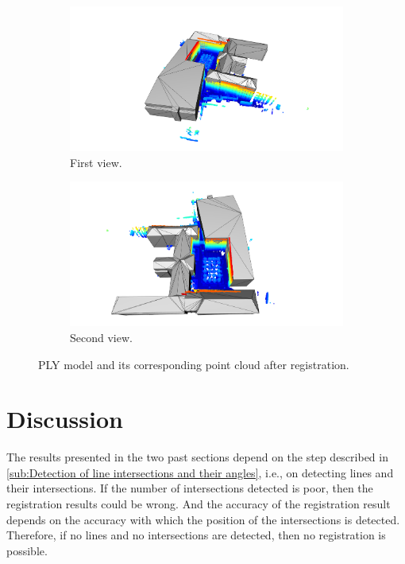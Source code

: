         \begin{figure}[H]
            \centering
            \begin{subfigure}{1\textwidth}
                \centering
                \includegraphics[scale=0.2]{images/solution_images/final_ply_a.png}
                \caption{First view.}
                \label{fig:final_ply_a}
            \end{subfigure}
            \hfill
            \begin{subfigure}{1\textwidth}
                \centering
                \includegraphics[scale=0.2]{images/solution_images/final_ply_b.png}
                \caption{Second view.}
                \label{fig:final_ply_b}
            \end{subfigure}
            \caption{PLY model and its corresponding point cloud after registration.}
            \label{fig:final_ply}
        \end{figure}

    \section{Discussion}
        The results presented in the two past sections depend on the step described in 
        \autoref{sub:Detection of line intersections and their angles}, i.e., on detecting lines and their intersections.
        If the number of intersections detected is poor, then the registration results could be wrong.
        And the accuracy of the registration result depends on the accuracy with which the position of the intersections is detected.
        Therefore, if no lines and no intersections are detected, then no registration is possible.

